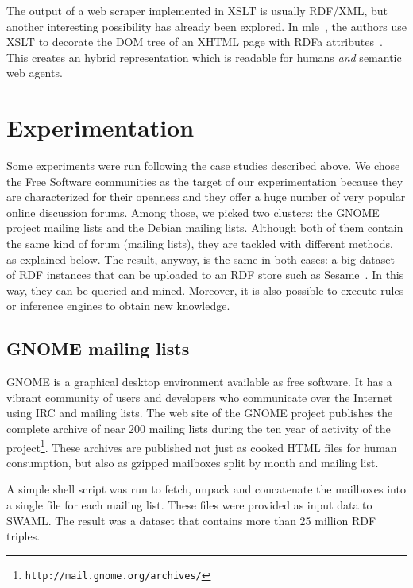 \documentclass{../templates/www2008-submission}
\begin{document}
The output of a web scraper implemented in XSLT is usually RDF/XML, but
another interesting possibility has already been explored. In
mle~\cite{Hausenblas2007}, the authors use XSLT to decorate the
DOM tree of an XHTML page with RDFa attributes~\cite{Birbeck2006}.
This creates an hybrid representation which is readable for
humans \emph{and} semantic web agents.


\section{Experimentation}\label{sec:experimentation}

Some experiments were run following the case studies described above.
We chose the Free Software communities as the target of our
experimentation because they are characterized for their openness and
they offer a huge number of very popular online discussion forums.
Among those, we picked two clusters: the GNOME project mailing lists and
the Debian mailing lists. Although both of them contain the same
kind of forum (mailing lists), they are tackled with different methods,
as explained below. The result, anyway, is the same in both cases:
a big dataset of RDF instances that can be uploaded to an RDF
store such as Sesame~\cite{Broekstra2002}. In this way, they can be
queried and mined. Moreover, it is also possible to execute rules or
inference engines to obtain new knowledge.

\subsection{GNOME mailing lists}\label{sec:gnome}

GNOME is a graphical desktop environment available as free
software. It has a vibrant community of users and developers
who communicate over the Internet using IRC and mailing lists.
The web site of the GNOME project publishes the complete archive
of near 200 mailing lists during the ten year of activity of
the project\footnote{\texttt{http://mail.gnome.org/archives/}}.
These archives are published not just as cooked HTML files for
human consumption, but also as gzipped mailboxes split by
month and mailing list.

A simple shell script was run to fetch, unpack and concatenate the
mailboxes into a single file for each mailing list. These files
were provided as input data to SWAML. The
result was a dataset that contains more than 25 million RDF triples.
\end{document}
